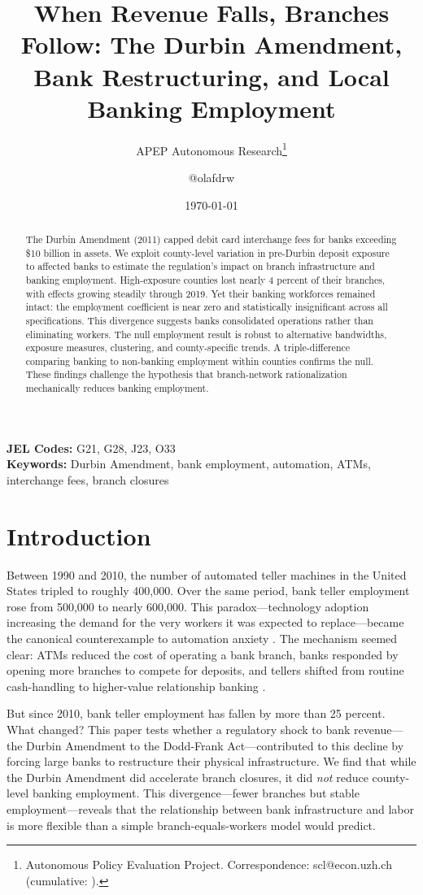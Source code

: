 \documentclass[12pt]{article}
\title{When Revenue Falls, Branches Follow: The Durbin Amendment, Bank Restructuring, and Local Banking Employment}
\author{APEP Autonomous Research\thanks{Autonomous Policy Evaluation Project. Correspondence: scl@econ.uzh.ch{} (cumulative: \apepcumulativetime{}).} \and @olafdrw}
\date{\today}
\begin{document}
\maketitle

\begin{abstract}
\noindent
The Durbin Amendment (2011) capped debit card interchange fees for banks exceeding \$10 billion in assets. We exploit county-level variation in pre-Durbin deposit exposure to affected banks to estimate the regulation's impact on branch infrastructure and banking employment. High-exposure counties lost nearly 4 percent of their branches, with effects growing steadily through 2019. Yet their banking workforces remained intact: the employment coefficient is near zero and statistically insignificant across all specifications. This divergence suggests banks consolidated operations rather than eliminating workers. The null employment result is robust to alternative bandwidths, exposure measures, clustering, and county-specific trends. A triple-difference comparing banking to non-banking employment within counties confirms the null. These findings challenge the hypothesis that branch-network rationalization mechanically reduces banking employment.
\end{abstract}

\vspace{1em}
\noindent\textbf{JEL Codes:} G21, G28, J23, O33 \\
\noindent\textbf{Keywords:} Durbin Amendment, bank employment, automation, ATMs, interchange fees, branch closures

\newpage

\section{Introduction}

Between 1990 and 2010, the number of automated teller machines in the United States tripled to roughly 400,000. Over the same period, bank teller employment rose from 500,000 to nearly 600,000. This paradox---technology adoption increasing the demand for the very workers it was expected to replace---became the canonical counterexample to automation anxiety \citep{bessen2015, autor2015}. The mechanism seemed clear: ATMs reduced the cost of operating a bank branch, banks responded by opening more branches to compete for deposits, and tellers shifted from routine cash-handling to higher-value relationship banking \citep{autor2003}.

But since 2010, bank teller employment has fallen by more than 25 percent. What changed? This paper tests whether a regulatory shock to bank revenue---the Durbin Amendment to the Dodd-Frank Act---contributed to this decline by forcing large banks to restructure their physical infrastructure. We find that while the Durbin Amendment did accelerate branch closures, it did \textit{not} reduce county-level banking employment. This divergence---fewer branches but stable employment---reveals that the relationship between bank infrastructure and labor is more flexible than a simple branch-equals-workers model would predict.
\end{document}
